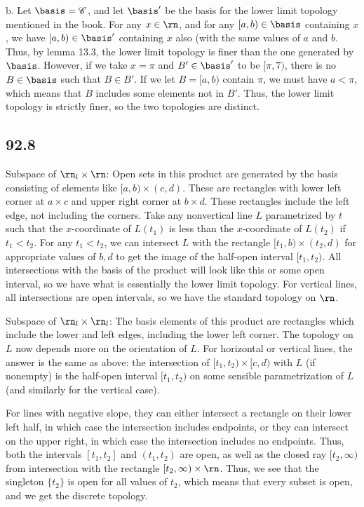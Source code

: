 \documentclass{article}
\begin{document}
b. Let $\basis=\mathscr{C}$, and let $\basis'$ be the basis for the lower limit topology mentioned in the book. For any $x\in\rn$, and for any $[a,b)\in\basis$ containing $x$, we have $[a,b)\in\basis'$ containing $x$ also (with the same values of $a$ and $b$. Thus, by lemma 13.3, the lower limit topology is finer than the one generated by $\basis$. However, if we take $x=\pi$ and $B'\in\basis'$ to be $[\pi,7)$, there is no $B\in\basis$ such that $B\in B'$. If we let $B=[a,b)$ contain $\pi$, we must have $a<\pi$, which means that $B$ includes some elements not in $B'$. Thus, the lower limit topology is strictly finer, so the two topologies are distinct.
\subsection*{92.8}
Subspace of $\rn_l\times\rn$: Open sets in this product are generated by the basis consisting of elements like $[a,b)\times(c,d)$. These are rectangles with lower left corner at $a\times c$ and upper right corner at $b\times d$. These rectangles include the left edge, not including the corners. Take any nonvertical line $L$ parametrized by $t$ such that the $x$-coordinate of $L(t_1)$ is less than the $x$-coordinate of $L(t_2)$ if $t_1<t_2$. For any $t_1<t_2$, we can intersect $L$ with the rectangle $[t_1,b)\times(t_2,d)$ for appropriate values of $b,d$ to get the image of the half-open interval $[t_1,t_2)$. All intersections with the basis of the product will look like this or some open interval, so we have what is essentially the lower limit topology. For vertical lines, all intersections are open intervals, so we have the standard topology on $\rn$. 

Subspace of $\rn_l\times\rn_l$: The basis elements of this product are rectangles which include the lower and left edges, including the lower left corner. The topology on $L$ now depends more on the orientation of $L$. For horizontal or vertical lines, the answer is the same as above: the intersection of $[t_1,t_2)\times[c,d)$ with $L$ (if nonempty) is the half-open interval $[t_1,t_2)$ on some sensible parametrization of $L$ (and similarly for the vertical case). 

For lines with negative slope, they can either intersect a rectangle on their lower left half, in which case the intersection includes endpoints, or they can intersect on the upper right, in which case the intersection includes no endpoints. Thus, both the intervals $[t_1,t_2]$ and $(t_1,t_2)$ are open, as well as the closed ray $[t_2,\infty)$ from intersection with the rectangle $[t_2,\infty)\times\rn$. Thus, we see that the singleton $\{t_2\}$ is open for all values of $t_2$, which means that every subset is open, and we get the discrete topology. 
\end{document}
